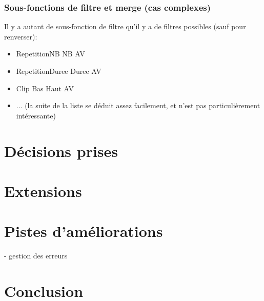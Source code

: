 \documentclass[12pt,a4paper]{article}
\begin{document}
\subsubsection{Sous-fonctions de filtre et merge (cas complexes)}

Il y a autant de sous-fonction de filtre qu'il y a de filtres possibles (sauf pour renverser):
\begin{itemize}
\item  {RepetitionNB NB AV}
\item {RepetitionDuree Duree AV}
\item {Clip Bas Haut AV}
\item ... (la suite de la liste se déduit assez facilement, et n'est pas particulièrement intéressante)
\end{itemize}




\section{Décisions prises}





\section{Extensions}






\section{Pistes d'améliorations}

- gestion des erreurs


\section{Conclusion}
\end{document}
